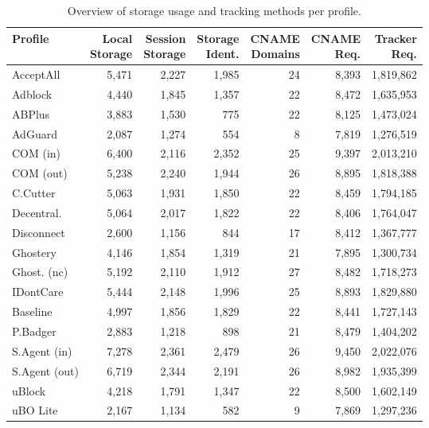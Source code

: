 \begin{table}[t]
\caption{Overview of storage usage and tracking methods per profile.}
\label{tab:storage-tracking}
\footnotesize
\begin{tabular}{lrrrrrr}
\toprule
\textbf{Profile} & \shortstack{\textbf{Local}\\\textbf{Storage}} & \shortstack{\textbf{Session}\\\textbf{Storage}} & \shortstack{\textbf{Storage}\\\textbf{Ident.}} & \shortstack{\textbf{CNAME}\\\textbf{Domains}} & \shortstack{\textbf{CNAME}\\\textbf{Req.}} & \shortstack{\textbf{Tracker}\\\textbf{Req.}} \\
\midrule
AcceptAll & 5,471 & 2,227 & 1,985 & 24 & 8,393 & 1,819,862 \\
Adblock & 4,440 & 1,845 & 1,357 & 22 & 8,472 & 1,635,953 \\
ABPlus & 3,883 & 1,530 & 775 & 22 & 8,125 & 1,473,024 \\
AdGuard & 2,087 & 1,274 & 554 & 8 & 7,819 & 1,276,519 \\
COM (in) & 6,400 & 2,116 & 2,352 & 25 & 9,397 & 2,013,210 \\
COM (out) & 5,238 & 2,240 & 1,944 & 26 & 8,895 & 1,818,388 \\
C.Cutter & 5,063 & 1,931 & 1,850 & 22 & 8,459 & 1,794,185 \\
Decentral. & 5,064 & 2,017 & 1,822 & 22 & 8,406 & 1,764,047 \\
Disconnect & 2,600 & 1,156 & 844 & 17 & 8,412 & 1,367,777 \\
Ghostery & 4,146 & 1,854 & 1,319 & 21 & 7,895 & 1,300,734 \\
Ghost. (nc) & 5,192 & 2,110 & 1,912 & 27 & 8,482 & 1,718,273 \\
IDontCare & 5,444 & 2,148 & 1,996 & 25 & 8,893 & 1,829,880 \\
Baseline & 4,997 & 1,856 & 1,829 & 22 & 8,441 & 1,727,143 \\
P.Badger & 2,883 & 1,218 & 898 & 21 & 8,479 & 1,404,202 \\
S.Agent (in) & 7,278 & 2,361 & 2,479 & 26 & 9,450 & 2,022,076 \\
S.Agent (out) & 6,719 & 2,344 & 2,191 & 26 & 8,982 & 1,935,399 \\
uBlock & 4,218 & 1,791 & 1,347 & 22 & 8,500 & 1,602,149 \\
uBO Lite & 2,167 & 1,134 & 582 & 9 & 7,869 & 1,297,236 \\
\bottomrule
\end{tabular}
\end{table}